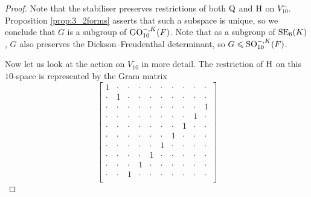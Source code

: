 \begin{proof}
	Note that the stabiliser preserves restrictions of both $\mathord{\mathrm{Q}}$ and $\mathrm{H}$ on $V_{10}^-$. Proposition
	\ref{prop:3_2forms} asserts that such a subspace is unique, so we conclude that $G$ is 
	a subgroup of $\mathrm{GO}_{10}^{-,K}(F)$. Note that as a subgroup of $\mathrm{SE}_6(K)$, $G$ also preserves 
	the Dickson--Freudenthal determinant, so $G \leqslant \mathrm{SO}_{10}^{-,K}(F)$.
	
	Now let us look at the action on $V_{10}^{-}$ in more detail. The restriction of $\mathrm{H}$ on
	this $10$-space is represented by the Gram matrix
	\begin{equation*}
		\begin{bmatrix}
			1 & \cdot & \cdot & \cdot & \cdot & \cdot & \cdot & \cdot & \cdot & \cdot \\
			\cdot & 1 & \cdot & \cdot & \cdot & \cdot & \cdot & \cdot & \cdot & \cdot \\
			\cdot & \cdot & \cdot & \cdot & \cdot & \cdot & \cdot & \cdot & \cdot & 1 \\
			\cdot & \cdot & \cdot & \cdot & \cdot & \cdot & \cdot & \cdot & 1 & \cdot \\
			\cdot & \cdot & \cdot & \cdot & \cdot & \cdot & \cdot & 1 & \cdot & \cdot \\
			\cdot & \cdot & \cdot & \cdot & \cdot & \cdot & 1 & \cdot & \cdot & \cdot \\
			\cdot & \cdot & \cdot & \cdot & \cdot & 1 & \cdot & \cdot & \cdot & \cdot \\
			\cdot & \cdot & \cdot & \cdot & 1 & \cdot & \cdot & \cdot & \cdot & \cdot \\
			\cdot & \cdot & \cdot & 1 & \cdot & \cdot & \cdot & \cdot & \cdot & \cdot \\
			\cdot & \cdot & 1 & \cdot & \cdot & \cdot & \cdot & \cdot & \cdot & \cdot \\
		\end{bmatrix}
	\end{equation*}

\end{proof}
